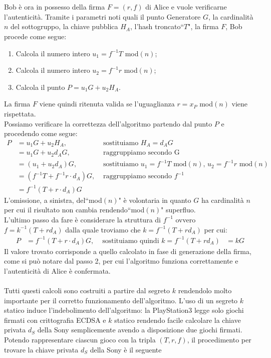 \documentclass[a4paper,12pt]{tesiinfo}
\begin{document}
\\
\\
Bob \`e ora in possesso della firma $F = (r, f)$ di Alice e vuole verificarne l'autenticit\`a. Tramite i parametri noti quali il punto Generatore $G$, la cardinalit\`a $n$ del sottogruppo, la chiave pubblica $H_A$, l'hash troncato``$T$", la firma $F$, Bob procede come segue:
\begin{enumerate}
  \item Calcola il numero intero $u_1 = f^{-1}T$ mod$(n)$;
  \item Calcola il numero intero $u_2 = f^{-1}r$ mod$(n)$;
  \item Calcola il punto $P = u_1G + u_2H_A$.
\end{enumerate}
La firma $F$ viene quindi ritenuta valida se l'uguaglianza $r = x_P $ mod$(n)$ viene rispettata.
\\
Possiamo verificare la correttezza dell'algoritmo partendo dal punto $P$ e procedendo come segue:
\begin{align*}
  P &= u_1G + u_2H_A, &\text{ sostituiamo } H_A = d_AG\\
  &= u_1G + u_2d_AG, &\text{ raggruppiamo secondo G }\\
  &= (u_1 + u_2d_A)G, &\text{ sostituiamo } u_1 = f^{-1}T \text{ mod$(n)$, } u_2 = f^{-1}r\text{ mod$(n)$}\\
  &= (f^{-1}T + f^{-1}r \cdot d_A)G, &\text{ raggruppiamo secondo } f^{-1}\\
  &= f^{-1}(T + r \cdot d_A)G
\end{align*}
L'omissione, a sinistra, del``mod$(n)$" \`e volontaria in quanto $G$ ha cardinalit\`a $n$ per cui il risultato non cambia rendendo``mod$(n)$" superfluo.
\\
L'ultimo passo da fare \`e considerare la struttura di $f^{-1}$ ovvero $f = k^{-1} (T+rd_A)$ dalla quale troviamo che $k = f^{-1} (T+rd_A)$ per cui:
\begin{align*}
  P &= f^{-1}(T + r \cdot d_A)G, &\text{ sostituiamo quindi } k = f^{-1} (T+rd_A)
  &= kG
\end{align*}
Il valore trovato corrisponde a quello calcolato in fase di generazione della firma, come si pu\`o notare dal passo 2, per cui l'algoritmo funziona correttamente e l'autenticit\`a di Alice \`e confermata.
\\
\\
Tutti questi calcoli sono costruiti a partire dal segreto $k$ rendendolo molto importante per il corretto funzionamento dell'algoritmo. L'uso di un segreto $k$ statico induce l'indebolimento dell'algoritmo: la PlayStation3 legge solo giochi firmati con crittografia ECDSA e $k$ statico rendendo facile calcolare la chiave privata $d_S$ della Sony semplicemente avendo a disposizione due giochi firmati. Potendo rappresentare ciascun gioco con la tripla $(T, r, f)$, il procedimento per trovare la chiave privata $d_S$ della Sony \`e il seguente
\end{document}
